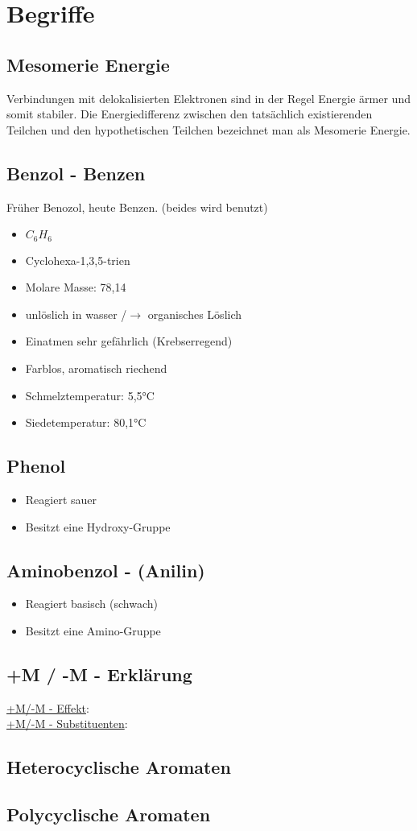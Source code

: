 \section{Begriffe}
\subsection{Mesomerie Energie}
Verbindungen mit delokalisierten Elektronen sind in der 
Regel Energie ärmer und somit stabiler. 
Die Energiedifferenz zwischen den tatsächlich existierenden 
Teilchen und den hypothetischen Teilchen bezeichnet man als 
Mesomerie Energie.

\subsection{Benzol - Benzen}
Früher Benozol, heute Benzen. (beides wird benutzt)
\begin{itemize}
    \item $C_6H_6$
    \item Cyclohexa-1,3,5-trien
    \item Molare Masse: 78,14
    \item unlöslich in wasser /$\rightarrow$ organisches Löslich
    \item Einatmen sehr gefährlich (Krebserregend)
    \item Farblos, aromatisch riechend
    \item Schmelztemperatur: 5,5°C
    \item Siedetemperatur: 80,1°C
\end{itemize}

\subsection{Phenol}
\begin{itemize}
    \item Reagiert sauer
    \item Besitzt eine Hydroxy-Gruppe
\end{itemize}

\subsection{Aminobenzol - (Anilin)}
\begin{itemize}
    \item Reagiert basisch (schwach)
    \item Besitzt eine Amino-Gruppe
\end{itemize}

\subsection{+M / -M - Erklärung}
\underline{+M/-M - Effekt}: \\
\underline{+M/-M - Substituenten}: \\


\subsection{Heterocyclische Aromaten}

\subsection{Polycyclische Aromaten}
